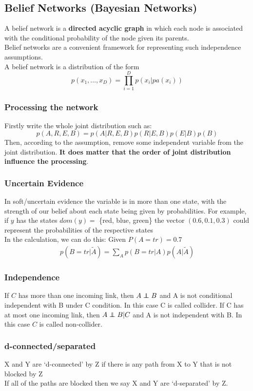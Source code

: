 \documentclass[12pt,a4paper]{article}
\newcommand\independent{\protect\mathpalette{\protect\independenT}{\perp}}
\def\independenT#1#2{\mathrel{\rlap{$#1#2$}\mkern2mu{#1#2}}}
\begin{document}
\subsection*{Belief Networks (Bayesian Networks)}
A belief network is a \textbf{directed acyclic graph} in which each node is associated with the conditional probability of the node given its parents.\\
Belief networks are a convenient framework for representing such independence assumptions. \\
A belief network is a distribution of the form
$$
p(x_1,\ldots,x_D) = \prod_{i=1}^{D}p(x_i|pa(x_i))
$$
\subsubsection*{Processing the network}
Firstly write the whole joint distribution such as:
$$
p(A,R,E,B) = p(A|R,E,B)p(R|E,B)p(E|B)p(B)
$$
Then, according to the assumption, remove some independent variable from the joint distribution. \textbf{It does matter that the order of joint distribution influence the processing}.
\subsubsection*{Uncertain Evidence}
In soft/uncertain evidence the variable is in more than one state, with the strength of our belief about each state being given by probabilities. For example, if $y$ has the states $dom(y) =$ \{red, blue, green\} the vector $(0.6, 0.1, 0.3)$ could represent the probabilities of the respective states\\
In the calculation, we can do this: Given $P(A=tr)=0.7$ 
\begin{eqnarray*}
p(B=tr|\widetilde{A}) = \sum_{A}p(B=tr|A)p(A|\widetilde{A}) 
\end{eqnarray*}
\subsubsection*{Independence}
If $C$ has more than one incoming link, then $A\independent B$ and A is not conditional independent with B under C condition. In this case C is called collider.
If C has at most one incoming link, then $A \independent B|C$ and A is not independent with B. In this case $C$ is called non-collider.
\subsubsection*{d-connected/separated}
X and Y are ‘d-connected’ by Z if there is any path from X to Y that is not blocked by Z\\
If all of the paths are blocked then we say X and Y are ‘d-separated’ by Z.
\end{document}
